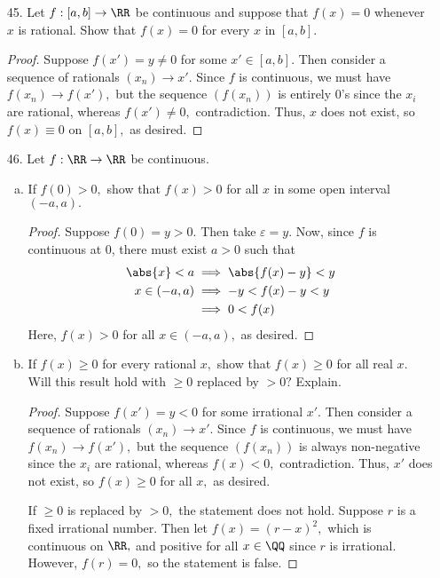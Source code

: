 \documentclass{article}
\begin{document}
\begin{itemize}
	\item[45.] Let $f:[a, b]\to\RR$ be continuous and suppose that $f(x)=0$ whenever $x$ is rational. Show that $f(x)=0$ for every $x$ in $[a, b].$
		\begin{proof}
			Suppose $f(x')=y\neq 0$ for some $x'\in[a, b].$ Then consider a sequence of rationals $(x_n)\to x'.$ Since $f$ is continuous, we must have $f(x_n)\to f(x'),$ but the sequence $(f(x_n))$ is entirely 0's since the $x_i$ are rational, whereas $f(x')\neq 0,$ contradiction. Thus, $x$ does not exist, so $f(x)\equiv0$ on $[a, b],$ as desired.
		\end{proof}

	\item[46.] Let $f:\RR\to\RR$ be continuous.
		\begin{enumerate}[(a)]
			\item If $f(0)>0,$ show that $f(x)>0$ for all $x$ in some open interval $(-a, a).$
				\begin{proof}
					Suppose $f(0)=y>0.$ Then take $\varepsilon=y.$ Now, since $f$ is continuous at 0, there must exist $a>0$ such that
					\begin{align*}
						\abs{x}<a &\implies \abs{f(x)-y}<y \\
						x\in(-a, a) &\implies -y<f(x)-y<y \\
						&\implies 0 < f(x)
					\end{align*}
					Here, $f(x)>0$ for all $x\in(-a, a),$ as desired.
				\end{proof}

			\item If $f(x)\ge 0$ for every rational $x,$ show that $f(x)\ge0$ for all real $x.$ Will this result hold with $\ge0$ replaced by $>0?$ Explain.
				\begin{proof}
					Suppose $f(x')=y<0$ for some irrational $x'.$ Then consider a sequence of rationals $(x_n)\to x'.$ Since $f$ is continuous, we must have $f(x_n)\to f(x'),$ but the sequence $(f(x_n))$ is always non-negative since the $x_i$ are rational, whereas $f(x)<0,$ contradiction. Thus, $x'$ does not exist, so $f(x)\ge 0$ for all $x,$ as desired. 

					If $\ge 0$ is replaced by $>0,$ the statement does not hold. Suppose $r$ is a fixed irrational number. Then let $f(x)=(r-x)^2,$ which is continuous on $\RR,$ and positive for all $x\in\QQ$ since $r$ is irrational. However, $f(r)=0,$ so the statement is false.
				\end{proof}
				
		\end{enumerate}
		
\end{itemize}
\end{document}

